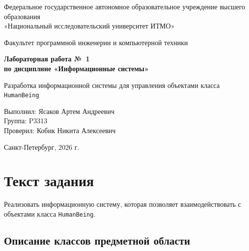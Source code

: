 \documentclass[14pt,a4paper]{extarticle}
\begin{document}
\begin{titlepage}
    \centering
    {\normalsize Федеральное государственное автономное образовательное учреждение высшего образования\\
    «Национальный исследовательский университет ИТМО»\par}

    \vspace{0.5cm}
    {\normalsize Факультет программной инженерии и компьютерной техники\par}

    \vspace{2.5cm}
    {\Large \textbf{Лабораторная работа №~1\\по дисциплине «Информационные системы»}\par}

    \vspace{0.5cm}
    {\large Разработка информационной системы для управления объектами класса \texttt{HumanBeing}\par}

    \vspace{4cm}
    \begin{flushright}
        Выполнил: Ясаков Артем Андреевич\\
        Группа: P3313\\
        Проверил: Кобик Никита Алексеевич
    \end{flushright}

    \vfill
    {\normalsize Санкт-Петербург, 2026 г.\par}
\end{titlepage}

\tableofcontents
\newpage

\section{Текст задания}

Реализовать информационную систему, которая позволяет взаимодействовать с объектами класса \texttt{HumanBeing}.

\subsection{Описание классов предметной области}
\end{document}
